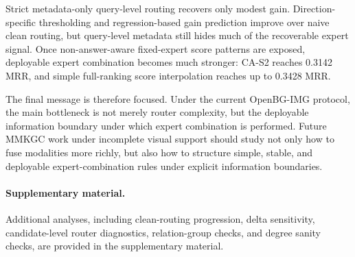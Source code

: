 \documentclass[11pt]{article}
\begin{document}
Strict metadata-only query-level routing recovers only modest gain. Direction-specific thresholding and regression-based gain prediction improve over naive clean routing, but query-level metadata still hides much of the recoverable expert signal. Once non-answer-aware fixed-expert score patterns are exposed, deployable expert combination becomes much stronger: CA-S2 reaches 0.3142 MRR, and simple full-ranking score interpolation reaches up to 0.3428 MRR.

The final message is therefore focused. Under the current OpenBG-IMG protocol, the main bottleneck is not merely router complexity, but the deployable information boundary under which expert combination is performed. Future MMKGC work under incomplete visual support should study not only how to fuse modalities more richly, but also how to structure simple, stable, and deployable expert-combination rules under explicit information boundaries.

\paragraph{Supplementary material.}
Additional analyses, including clean-routing progression, delta sensitivity, candidate-level router diagnostics, relation-group checks, and degree sanity checks, are provided in the supplementary material.



\end{document}
